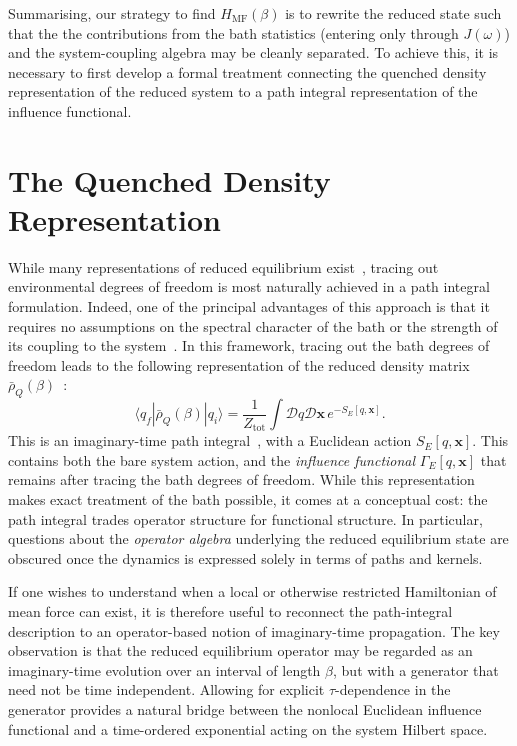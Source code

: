 ﻿\documentclass[aps,prl,twocolumn,superscriptaddress,showpacs,floatfix]{revtex4-2}
\begin{document}
Summarising, our strategy to find $H_{\mathrm{MF}}(\beta)$ is to rewrite the reduced state such that the the contributions from the bath statistics (entering only through $J(\omega)$) and the system-coupling algebra may be cleanly separated. To achieve this, it is necessary to first develop a formal treatment connecting the quenched density representation of the reduced system to a path integral representation of the influence functional. 


 \section{\label{sec:quenched}The Quenched Density Representation}



While many representations of reduced equilibrium exist~\cite{weissQuantumDissipativeSystems2012, breuerTheoryOpenQuantum2002, grabertQuantumBrownianMotion1988}, tracing out environmental degrees of freedom is most naturally achieved in a path integral formulation. Indeed, one of the principal advantages of this approach is that it requires no assumptions on the spectral character of the bath or the strength of its coupling to the system~\cite{weissQuantumDissipativeSystems2012}. In this framework, tracing out the bath degrees of freedom leads to the following representation of the reduced density matrix $\bar{\rho}_Q(\beta)$~\cite{feynmanQuantumMechanicsPath1965, kleinertPathIntegralsQuantum2009}:
\begin{equation}
    \langle q_f|\bar{\rho}_Q(\beta)|q_i\rangle = \frac{1}{Z_{\mathrm{tot}}} \int \mathcal{D}q \mathcal{D}\mathbf{x} \, e^{-S_E[q,\mathbf{x}]}.
\end{equation}
This is an imaginary-time path integral~\cite{feynmanQuantumMechanicsPath1965, kleinertPathIntegralsQuantum2009}, with a Euclidean action $S_E[q,\mathbf{x}]$. This contains both the bare system action, and the \emph{influence functional} $\Gamma_E[q,\mathbf{x}]$ that remains after tracing the bath degrees of freedom. While this representation makes exact treatment of the bath possible, it comes at a conceptual cost: the path
integral trades operator structure for functional structure. In particular,
questions about the \emph{operator algebra} underlying the reduced equilibrium
state are obscured once the dynamics is expressed solely in terms of paths and
kernels.

If one wishes to understand when a local or otherwise restricted Hamiltonian of
mean force can exist, it is therefore useful to reconnect the path-integral
description to an operator-based notion of imaginary-time propagation. The key
observation is that the reduced equilibrium operator may be regarded as an
imaginary-time evolution over an interval of length $\beta$, but with a generator
that need not be time independent. Allowing for explicit $\tau$-dependence in
the generator provides a natural bridge between the nonlocal Euclidean influence
functional and a time-ordered exponential acting on the system Hilbert space.
\end{document}
